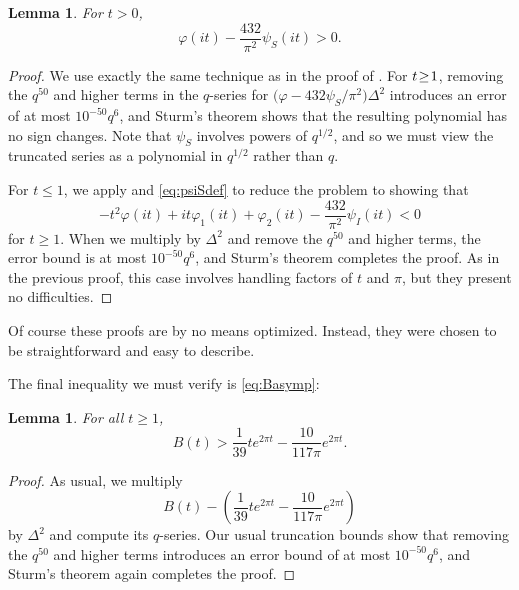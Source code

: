 \documentclass{aomart}
\theoremstyle{plain}
\newtheorem{lemma}[theorem]{Lemma}
\numberwithin{theorem}{section}
\numberwithin{equation}{section}
\begin{document}
\begin{lemma} \label{lemma:ineq2}
For $t > 0$,
\[
\varphi(it) - \frac{432}{\pi^2} \psi_S(it) > 0.
\]
\end{lemma}

\begin{proof}
We use exactly the same technique as in the proof of
.
For $t \mkern-3.5mu\ge\mkern-3.5mu 1$, removing the $q^{50}$ and higher terms
in the $q$-series for $\big(\varphi - 432 \psi_S/\pi^2\big)\Delta^2$
introduces an error of at most $10^{-50} q^6$, and Sturm's theorem shows that
the resulting polynomial has no sign changes. Note that $\psi_S$ involves
powers of $q^{1/2}$, and so we must view the truncated series as a polynomial
in $q^{1/2}$ rather than $q$.

For $t \le 1$, we apply  and
\eqref{eq:psiSdef} to reduce the problem to showing that
\[
-t^2 \varphi(it) + i t \varphi_1(it) + \varphi_2(it) -\frac{432}{\pi^2} \psi_I(it) < 0
\]
for $t \ge 1$.  When we multiply by $\Delta^2$ and remove the $q^{50}$ and
higher terms, the error bound is at most $10^{-50} q^6$, and Sturm's theorem
completes the proof.  As in the previous proof, this case involves handling
factors of $t$ and $\pi$, but they present no difficulties.
\end{proof}

Of course these proofs are by no means optimized.  Instead, they were chosen
to be straightforward and easy to describe.

The final inequality we must verify is \eqref{eq:Basymp}:

\begin{lemma} \label{lemma:Bleadingterms}
For all $t \ge 1$,
\[
B(t) > \frac{1}{39}te^{2\pi t}-\frac{10}{117\pi}e^{2\pi t}.
\]
\end{lemma}

\begin{proof}
As usual, we multiply
\[
B(t) -\left( \frac{1}{39}te^{2\pi t}-\frac{10}{117\pi}e^{2\pi t}\right)
\]
by $\Delta^2$ and compute its $q$-series.  Our usual truncation bounds show
that
re\-moving the $q^{50}$ and higher terms introduces an error bound of at most
$10^{-50} q^6$, and Sturm's theorem again completes the proof.
\end{proof}
\end{document}
